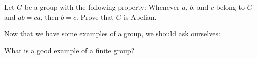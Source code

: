 \documentclass{ximera}
\begin{document}
\begin{exercise}
  Let $G$ be a group with the following property: Whenever $a$, $b$,
  and $c$ belong to $G$ and $ab = ca$, then $b = c$. Prove that $G$ is
  Abelian.
\end{exercise}


Now that we have some examples of a group, we should ask ourselves:

\begin{question}
  What is a good example of a finite group?
\end{question}






\end{document}
